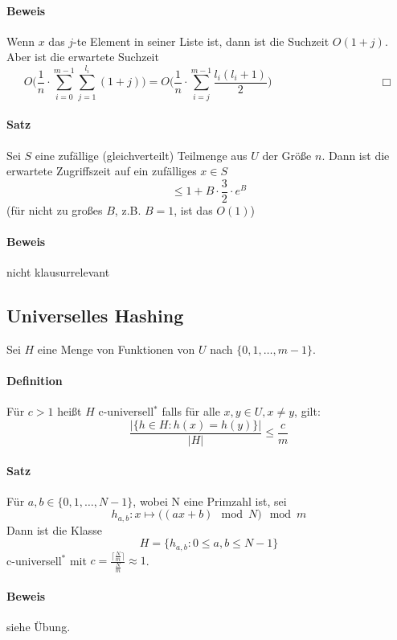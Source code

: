 \paragraph*{Beweis} Wenn $x$ das $j$-te Element in seiner Liste ist, dann ist die Suchzeit $O(1+j)$. Aber ist die erwartete Suchzeit $$ O\Big(\frac{1}{n} \cdot \sum\limits_{i=0}^{m-1} \sum\limits_{j=1}^{l_i} (1+j)\Big) = O\Big(\frac{1}{n} \cdot \sum\limits_{i=j}^{m-1} \frac{l_i(l_i+1)}{2}\Big) \hspace{4cm} \Box$$

\paragraph*{Satz} Sei $S$ eine zufällige (gleichverteilt) Teilmenge aus $U$ der Größe $n$. Dann ist die erwartete Zugriffszeit auf ein zufälliges $x \in S$ $$ \leq 1 + B \cdot \frac{3}{2} \cdot e^B $$ (für nicht zu großes $B$, z.B. $B=1$, ist das $O(1)$)

\paragraph*{Beweis} nicht klausurrelevant



\subsection{Universelles Hashing}
Sei $H$ eine Menge von Funktionen von $U$ nach $\{ 0,1,\dots,m-1 \}$.

\paragraph*{Definition} Für $c>1$ heißt $H$ c-universell$^*$ falls für alle $x,y \in U, x\not=y$, gilt:
$$ \frac{\big|\{ h \in H : h(x) = h(y) \}\big|}{|H|} \leq \frac{c}{m} $$

\paragraph*{Satz} Für $a,b \in \{ 0,1,\dots,N-1 \}$, wobei N eine Primzahl ist, sei $$h_{a,b}: x \mapsto \big( (ax+b) \mod N \big) \mod m$$ Dann ist die Klasse $$ H=\{ h_{a,b}: 0 \leq a,b \leq N-1 \} $$ c-universell$^*$ mit $c=\frac{\lceil\frac{N}{m}\rceil}{\frac{N}{m}} \approx 1$.

\paragraph*{Beweis} siehe Übung.

